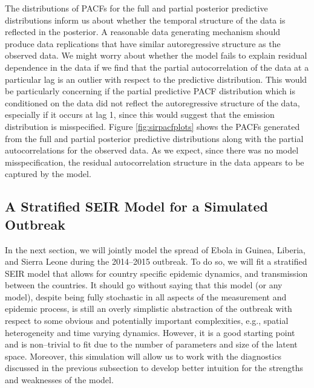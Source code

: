 The distributions of PACFs for the full and partial posterior predictive distributions inform us about whether the temporal structure of the data is reflected in the posterior. A reasonable data generating mechanism should produce data replications that have similar autoregressive structure as the observed data. We might worry about whether the model fails to explain residual dependence in the data if we find that the partial autocorrelation of the data at a particular lag is an outlier with respect to the predictive distribution. This would be particularly concerning if the partial predictive PACF distribution which is conditioned on the data did not reflect the autoregressive structure of the data, especially if it occurs at lag 1, since this would suggest that the emission distribution is misspecified. Figure \ref{fig:sirpacfplots} shows the PACFs generated from the full and partial posterior predictive distributions along with the partial autocorrelations for the observed data. As we expect, since there was no model misspecification, the residual autocorrelation structure in the data appears to be captured by the model.

\subsection{A Stratified SEIR Model for a Simulated Outbreak}
\label{subsec:ebola_synth}

In the next section, we will jointly model the spread of Ebola in Guinea, Liberia, and Sierra Leone during the 2014--2015 outbreak. To do so, we will fit a stratified SEIR model that allows for country specific epidemic dynamics, and transmission between the countries. It should go without saying that this model (or any model), despite being fully stochastic in all aspects of the measurement and epidemic process, is still an overly simplistic abstraction of the outbreak with respect to some obvious and potentially important complexities, e.g., spatial heterogeneity and time varying dynamics. However, it is a good starting point and is non--trivial to fit due to the number of parameters and size of the latent space. Moreover, this simulation will allow us to work with the diagnostics discussed in the previous subsection to develop better intuition for the strengths and weaknesses of the model. 

